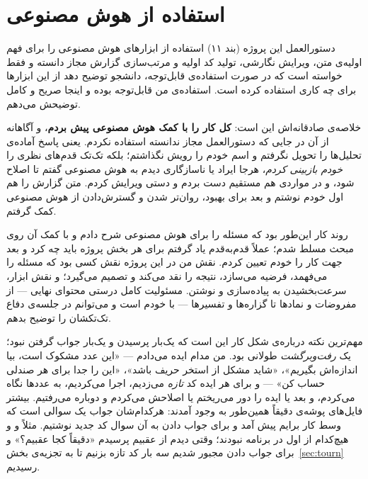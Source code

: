 \documentclass[12pt,a4paper]{article}
\begin{document}
\section{استفاده از هوش مصنوعی}

دستورالعمل این پروژه (بند ۱۱) استفاده از ابزارهای هوش مصنوعی را برای فهم
اولیه‌ی متن، ویرایش نگارشی، تولید کد اولیه و مرتب‌سازی گزارش مجاز دانسته و
فقط خواسته است که در صورت استفاده‌ی قابل‌توجه، دانشجو توضیح دهد از این ابزارها
برای چه کاری استفاده کرده است. استفاده‌ی من قابل‌توجه بوده و اینجا صریح و
کامل توضیحش می‌دهم.

خلاصه‌ی صادقانه‌اش این است: \textbf{کل کار را با کمک هوش مصنوعی پیش بردم}،
و آگاهانه از آن در جایی که دستورالعمل مجاز ندانسته استفاده نکردم. یعنی
پاسخ آماده‌ی تحلیل‌ها را تحویل نگرفتم و اسم خودم را رویش نگذاشتم؛ بلکه
تک‌تک قدم‌های نظری را \emph{خودم بازبینی کردم}، هرجا ایراد یا ناسازگاری
دیدم به هوش مصنوعی گفتم تا اصلاح شود، و در مواردی هم مستقیم دست بردم و
دستی ویرایش کردم. متن گزارش را هم اول خودم نوشتم و بعد برای بهبود، روان‌تر
شدن و گسترش‌دادن از هوش مصنوعی کمک گرفتم.

روند کار این‌طور بود که مسئله را برای هوش مصنوعی شرح دادم و با کمک آن روی
مبحث مسلط شدم؛ عملاً قدم‌به‌قدم یاد گرفتم برای هر بخش پروژه باید چه کرد و
بعد جهت کار را خودم تعیین کردم. نقش من در این پروژه نقش کسی بود که مسئله
را می‌فهمد، فرضیه می‌سازد، نتیجه را نقد می‌کند و تصمیم می‌گیرد؛ و نقش ابزار،
سرعت‌بخشیدن به پیاده‌سازی و نوشتن. مسئولیت کامل درستی محتوای نهایی — از
مفروضات و نمادها تا گزاره‌ها و تفسیرها — با خودم است و می‌توانم در جلسه‌ی
دفاع تک‌تکشان را توضیح بدهم.

مهم‌ترین نکته درباره‌ی شکل کار این است که یک‌بار پرسیدن و یک‌بار جواب گرفتن
نبود؛ یک \emph{رفت‌وبرگشت} طولانی بود. من مدام ایده می‌دادم — «این عدد
مشکوک است، بیا اندازه‌اش بگیریم»، «شاید مشکل از استخر حریف باشد»، «این را
جدا برای هر صندلی حساب کن» — و برای هر ایده کد \emph{تازه} می‌زدیم، اجرا
می‌کردیم، به عددها نگاه می‌کردم، و بعد یا ایده را دور می‌ریختم یا اصلاحش
می‌کردم و دوباره می‌رفتیم. بیشتر فایل‌های پوشه‌ی  دقیقاً
همین‌طور به وجود آمدند: هرکدام‌شان جواب یک سوالی است که وسط کار برایم پیش
آمد و برای جواب دادن به آن سوال کد جدید نوشتیم. مثلاً
 و  و  هیچ‌کدام از
اول در برنامه نبودند؛ وقتی دیدم از  عقبیم پرسیدم «دقیقاً کجا
عقبیم؟» و برای جواب دادن مجبور شدیم سه بار کد تازه بزنیم تا به تجزیه‌ی
بخش~\ref{sec:tourn} رسیدیم.
\end{document}
